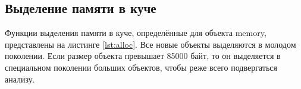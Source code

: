 %
%
%
%
%
%
%
%	
%
%	
%
%
%
%
%		
%		
%		
%		



\subsection*{Выделение памяти в куче}

Функции выделения памяти в куче, определённые для объекта memory, представлены на листинге \ref{lst:alloc}. Все новые объекты выделяются в молодом поколении. Если размер объекта превышает 85000 байт, то он выделяется в специальном поколении больших объектов, чтобы реже всего подвергаться анализу.

